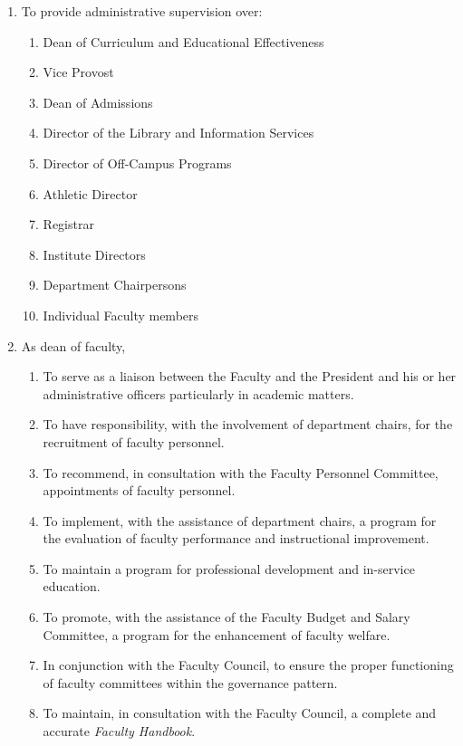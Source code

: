 \begin{enumerate}
{\begin{enumerate}
{\begin{enumerate}
										\item{To provide administrative supervision over:
											\begin{enumerate}
												\item{Dean of Curriculum and Educational Effectiveness}
												\item{Vice Provost}
												\item{Dean of Admissions}
												\item{Director of the Library and Information Services}
												\item{Director of Off-Campus Programs}
												\item{Athletic Director}
												\item{Registrar}
												\item{Institute Directors}
												\item{Department Chairpersons}
												\item{ Individual Faculty members}
											\end{enumerate}
										}
										\item{As dean of faculty,
											\begin{enumerate}
												\item{To serve as a liaison between the Faculty and the President and his or her administrative officers particularly in academic matters.}
												\item{To have responsibility, with the involvement of department chairs, for the recruitment of faculty personnel.}
												\item{To recommend, in consultation with the Faculty Personnel Committee, appointments of faculty personnel.}
												\item{To implement, with the assistance of department chairs, a program for the evaluation of faculty performance and instructional improvement.}
												\item{To maintain a program for professional development and in-service education.}
												\item{To promote, with the assistance of the Faculty Budget and Salary Committee, a program for the enhancement of faculty welfare.}
												\item{In conjunction with the Faculty Council, to ensure the proper functioning of faculty committees within the governance pattern.}
												\item{To maintain, in consultation with the Faculty Council, a complete and accurate \emph{Faculty Handbook}.}

\end{enumerate}}
\end{enumerate}}
\end{enumerate}}
\end{enumerate}
